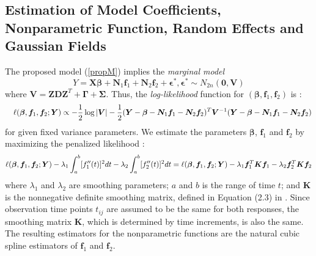 \documentclass[article,lineno]{biometrika}
\begin{document}
\subsection{Estimation of Model Coefficients, Nonparametric Function, Random Effects and Gaussian Fields} \label{estimation}

The proposed model (\ref{propM})  implies the {\it marginal model}
\[
Y = \boldsymbol{X}\boldsymbol{\beta} +
 \boldsymbol N_{1} \boldsymbol f_1 + 
  \boldsymbol N_{2} \boldsymbol f_2 + \boldsymbol \epsilon^*,   
\boldsymbol \epsilon^* \sim N_{2n}(\boldsymbol 0, \boldsymbol V) 
\]
where $\boldsymbol V = \boldsymbol  Z  \boldsymbol D  \boldsymbol Z^T
  +  \boldsymbol  \Gamma
  +   \boldsymbol \Sigma$.
  Thus, the {\it log-likelihood} function for 
$(\boldsymbol \beta, \boldsymbol f_1, \boldsymbol f_2)$  is :
\begin{eqnarray*}
&& 
\ell (\boldsymbol \beta, \boldsymbol f_1, \boldsymbol f_2; \boldsymbol Y)
\propto
-{1 \over 2} \log |\boldsymbol V| 
 -{1 \over 2}
 (\boldsymbol Y - \boldsymbol\beta 
 - \boldsymbol N_1 \boldsymbol f_1 - \boldsymbol N_2 \boldsymbol f_2)^T 
 \boldsymbol V^{-1} 
  (\boldsymbol Y - \boldsymbol\beta  
  - \boldsymbol N_1 \boldsymbol f_1 - \boldsymbol N_2 \boldsymbol f_2)
\end{eqnarray*}
for given fixed variance parameters.
We   estimate the parameters $\boldsymbol \beta$, $\boldsymbol f_1$ and $\boldsymbol f_2$ by  maximizing  the penalized likelihood \citep*{Wang:Guo:Brow:quan:2000}:
\begin{equation} \label{penLog}
\ell(\mbox{\boldmath$\beta$}, \boldsymbol f_1, \boldsymbol f_2 ; \boldsymbol Y) 
 - \lambda_1\int_a^b [f_1^{\prime\prime}(t)]^2 dt  
 - \lambda_2 \int_a^b [f_2^{\prime\prime}(t)]^2 dt 
= 
\ell(\mbox{\boldmath$\beta$}, \boldsymbol f_1, \boldsymbol f_2 ; \boldsymbol Y) 
- \lambda_1
\boldsymbol f_1^T \boldsymbol K \boldsymbol f_1
 - \lambda_2
\boldsymbol f_2^T \boldsymbol K \boldsymbol f_2 
\end{equation}
where 
$\lambda_1$ and $\lambda_2$ are smoothing parameters; 
$a$ and $b$ is the range of time $t$; and 
$\boldsymbol K$ is the nonnegative definite smoothing matrix, defined in Equation (2.3) in \citet{Green:1994}. 
Since observation time points $t_{ij}$ are assumed to be the same for both responses, the smoothing matrix $\bm K$, which is determined by time increments, is also the same.
The resulting estimators for the nonparametric functions  are  the natural cubic spline estimators  of $\boldsymbol f_1$ and $\boldsymbol f_2$. 
\end{document}
